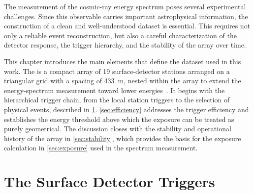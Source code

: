 \documentclass[main.tex]{subfiles}
\begin{document}


The measurement of the cosmic-ray energy spectrum poses several experimental challenges.
Since this observable carries important astrophysical information, the construction of a clean and well-understood dataset is essential.
This requires not only a reliable event reconstruction, but also a careful characterization of the detector response, the trigger hierarchy, and the stability of the array over time.

This chapter introduces the main elements that define the dataset used in this work.
The  is a compact array of 19 surface-detector stations arranged on a triangular grid with a spacing of \SI{433}{\m}, nested within the  array to extend the energy-spectrum measurement toward lower energies~\cite{BrichettoOrquera:2023:SecondKnee}.
It begins with the hierarchical trigger chain, from the local station triggers to the selection of physical events, described in \cref{sec:triggers}.
\cref{sec:efficiency} addresses the trigger efficiency and establishes the energy threshold above which the exposure can be treated as purely geometrical.
The discussion closes with the stability and operational history of the array in \cref{sec:stability}, which provides the basis for the exposure calculation in \cref{sec:exposure} used in the spectrum measurement.

\section{The Surface Detector Triggers}
\label{sec:triggers}
\end{document}
